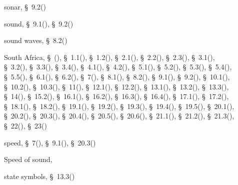 \begin{multicols}{2}
{\begin{description}
	  \item[] \noindent\raggedright sonar,  \S~9.2(\pageref{m38800})
	  
	  \item[] \noindent\raggedright sound,  \S~9.1(\pageref{m38799}),  \S~9.2(\pageref{m38800})
	  
	  \item[] \noindent\raggedright sound waves,  \S~8.2(\pageref{m38783})
	  
	  \item[] \noindent\raggedright South Africa,  \S~(\pageref{m30853}),  \S~1.1(\pageref{m38708}),  \S~1.2(\pageref{m38706}),  \S~2.1(\pageref{m38736}),  \S~2.2(\pageref{m38734}),  \S~2.3(\pageref{m38730}),  \S~3.1(\pageref{m38756}),  \S~3.2(\pageref{m38745}),  \S~3.3(\pageref{m38753}),  \S~3.4(\pageref{m38741}),  \S~4.1(\pageref{m38760}),  \S~4.2(\pageref{m38757}),  \S~5.1(\pageref{m38704}),  \S~5.2(\pageref{m38701}),  \S~5.3(\pageref{m38684}),  \S~5.4(\pageref{m38694}),  \S~5.5(\pageref{m38689}),  \S~6.1(\pageref{m38801}),  \S~6.2(\pageref{m38802}),  \S~7(\pageref{m38806}),  \S~8.1(\pageref{m38782}),  \S~8.2(\pageref{m38783}),  \S~9.1(\pageref{m38799}),  \S~9.2(\pageref{m38800}),  \S~10.1(\pageref{m38777}),  \S~10.2(\pageref{m38778}),  \S~10.3(\pageref{m38779}),  \S~11(\pageref{m38120}),  \S~12.1(\pageref{m38709}),  \S~12.2(\pageref{m38711}),  \S~13.1(\pageref{m38721}),  \S~13.2(\pageref{m38726}),  \S~13.3(\pageref{m38727}),  \S~14(\pageref{m37830}),  \S~15.2(\pageref{m38781}),  \S~16.1(\pageref{m38771}),  \S~16.2(\pageref{m38772}),  \S~16.3(\pageref{m38773}),  \S~16.4(\pageref{m38776}),  \S~17.1(\pageref{m38720}),  \S~17.2(\pageref{m38719}),  \S~18.1(\pageref{m38717}),  \S~18.2(\pageref{m38712}),  \S~19.1(\pageref{m38812}),  \S~19.2(\pageref{m38813}),  \S~19.3(\pageref{m38815}),  \S~19.4(\pageref{m38816}),  \S~19.5(\pageref{m38819}),  \S~20.1(\pageref{m38787}),  \S~20.2(\pageref{m38788}),  \S~20.3(\pageref{m38791}),  \S~20.4(\pageref{m38794}),  \S~20.5(\pageref{m38795}),  \S~20.6(\pageref{m38796}),  \S~21.1(\pageref{m38784}),  \S~21.2(\pageref{m38785}),  \S~21.3(\pageref{m38786}),  \S~22(\pageref{m38138}),  \S~23(\pageref{m38491})
	  
	  \item[] \noindent\raggedright speed,  \S~7(\pageref{m38806}),  \S~9.1(\pageref{m38799}),  \S~20.3(\pageref{m38791})
	  
	  \item[] \noindent\raggedright Speed of sound,  \pageref{id2448438}
	  
	  \item[] \noindent\raggedright state symbols,  \S~13.3(\pageref{m38727})
	  

\end{description}}
\end{multicols}
